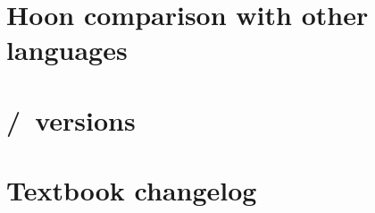 \section{Hoon comparison with other languages}

\section{\zuse/\lull~versions}

\section{Textbook changelog}
